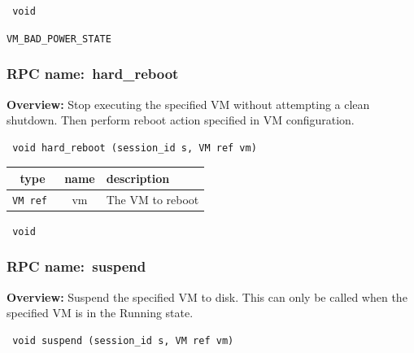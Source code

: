 {\tt 
void
}



\vspace{0.3cm}

 {\tt VM\_BAD\_POWER\_STATE}

\vspace{0.6cm}
\subsubsection{RPC name:~hard\_reboot}

{\bf Overview:} 
Stop executing the specified VM without attempting a clean shutdown. Then
perform reboot action specified in VM configuration.

\begin{verbatim} void hard_reboot (session_id s, VM ref vm)\end{verbatim}



 
\vspace{0.3cm}
\begin{tabular}{|c|c|p{7cm}|}
 \hline
{\bf type} & {\bf name} & {\bf description} \\ \hline
{\tt VM ref } & vm & The VM to reboot \\ \hline 

\end{tabular}

\vspace{0.3cm}

{\tt 
void
}



\vspace{0.3cm}
\vspace{0.3cm}
\vspace{0.3cm}
\subsubsection{RPC name:~suspend}

{\bf Overview:} 
Suspend the specified VM to disk.  This can only be called when the
specified VM is in the Running state.

\begin{verbatim} void suspend (session_id s, VM ref vm)\end{verbatim}



